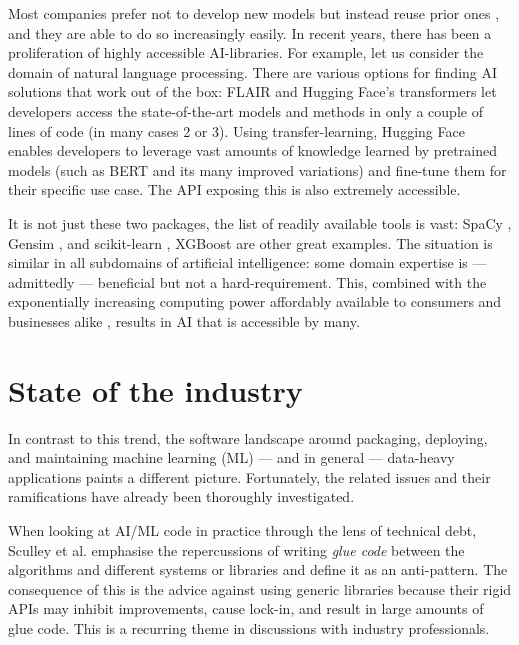 Most companies prefer not to develop new models but instead reuse prior ones \cite{bosch2021engineering}, and they are able to do so increasingly easily. In recent years, there has been a proliferation of highly accessible AI-libraries. For example, let us consider the domain of natural language processing. There are various options for finding AI solutions that work out of the box: FLAIR \cite{akbik2019flair} and Hugging Face's transformers \cite{wolf2019huggingface} let developers access the state-of-the-art models and methods in only a couple of lines of code (in many cases 2 or 3). Using transfer-learning, Hugging Face enables developers to leverage vast amounts of knowledge learned by pretrained models (such as BERT \cite{devlin2018bert} and its many improved variations) and fine-tune them for their specific use case. The API exposing this is also extremely accessible.

It is not just these two packages, the list of readily available tools is vast: SpaCy \cite{srinivasa2018natural}, Gensim \cite{vrehuuvrek2011gensim}, and scikit-learn \cite{pedregosa2011scikit}, XGBoost \cite{Chen_2016} are other great examples. The situation is similar in all subdomains of artificial intelligence: some domain expertise is --- admittedly --- beneficial but not a hard-requirement. This, combined with the exponentially increasing computing power affordably available to consumers and businesses alike \cite{sun2019summarizing}, results in AI that is accessible by many.

\section{State of the industry} \label{section:industry}

In contrast to this trend, the software landscape around packaging, deploying, and maintaining machine learning (ML) --- and in general --- data-heavy applications paints a different picture. Fortunately, the related issues and their ramifications have already been thoroughly investigated.

When looking at AI/ML code in practice through the lens of technical debt, Sculley et al. \cite{sculley2015hidden} emphasise the repercussions of writing \textit{glue code} between the algorithms and different systems or libraries and define it as an anti-pattern. The consequence of this is the advice against using generic libraries because their rigid APIs may inhibit improvements, cause lock-in, and result in large amounts of glue code. This is a recurring theme in discussions with industry professionals.

